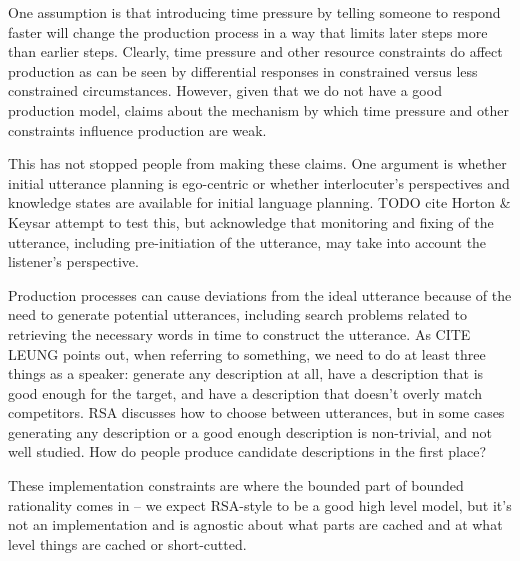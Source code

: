 \documentclass[]{article}
\begin{document}
One assumption is that introducing time pressure by telling someone to respond faster will change the production process in a way that limits later steps more than earlier steps. Clearly, time pressure and other resource constraints do affect production as can be seen by differential responses in constrained versus less constrained circumstances. However, given that we do not have a good production model, claims about the mechanism by which time pressure and other constraints influence production are weak.

This has not stopped people from making these claims. One argument is whether initial utterance planning is ego-centric or whether interlocuter's perspectives and knowledge states are available for initial language planning. TODO cite Horton \& Keysar attempt to test this, but acknowledge that monitoring and fixing of the utterance, including pre-initiation of the utterance, may take into account the listener's perspective. %

%



Production processes can cause deviations from the ideal utterance because of the need to generate potential utterances, including search problems related to retrieving the necessary words in time to construct the utterance. As CITE LEUNG points out, when referring to something, we need to do at least three things as a speaker: generate any description at all, have a description that is good enough for the target, and have a description that doesn't overly match competitors. RSA discusses how to choose between utterances, but in some cases generating any description or a good enough description is non-trivial, and not well studied. How do people produce candidate descriptions in the first place? 



These implementation constraints are where the bounded part of bounded rationality comes in -- we expect RSA-style to be a good high level model, but it's not an implementation and is agnostic about what parts are cached and at what level things are cached or short-cutted. 
\end{document}
